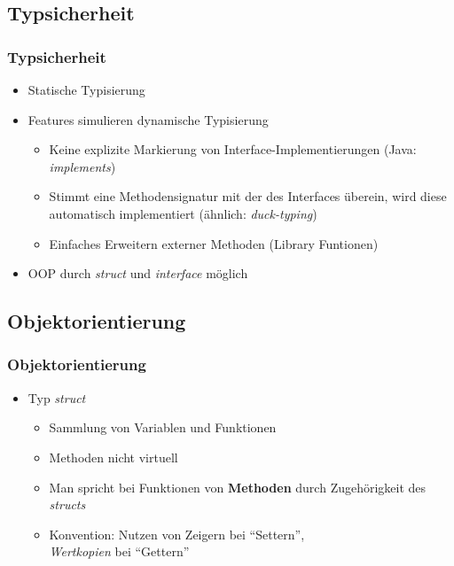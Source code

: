 \documentclass{beamer}
\begin{document}
\subsection{Typsicherheit}
\begin{frame}
\frametitle{Typsicherheit}

\begin{itemize}
\setlength{\itemsep}{24pt}
\item Statische Typisierung
\item Features simulieren dynamische Typisierung
\begin{itemize}
\setlength{\itemsep}{12pt}
\item Keine explizite Markierung von Interface-Implementierungen (Java: \textit{implements})
\item Stimmt eine Methodensignatur mit der des Interfaces \"uberein, wird diese automatisch implementiert (\"ahnlich: \textit{duck-typing})
\item Einfaches Erweitern externer Methoden (Library Funtionen)
\end{itemize}
\item OOP durch \textit{struct} und \textit{interface} m\"oglich
\end{itemize}

\end{frame}


\subsection{Objektorientierung}
\begin{frame}[fragile]
\frametitle{Objektorientierung}

\begin{itemize}
\item Typ \textit{struct}
\begin{itemize}
\setlength{\itemsep}{24pt}
\item Sammlung von Variablen und Funktionen
\item Methoden nicht virtuell
\item Man spricht bei Funktionen von \textbf{Methoden} durch Zugeh\"origkeit des \textit{structs}
\item Konvention: Nutzen von Zeigern bei ``Settern'',\\ \textit{Wertkopien} bei ``Gettern''
\end{itemize}
\end{itemize}

\end{frame}
\end{document}
